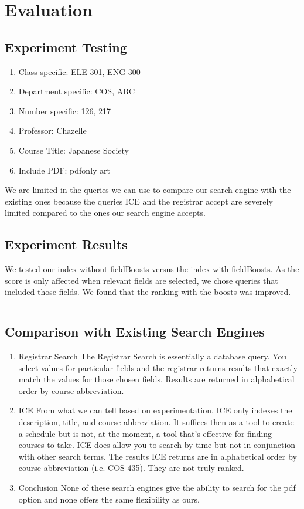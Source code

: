 \documentclass[12pt,letterpaper]{article}
\begin{document}
\section{Evaluation}
\subsection{Experiment Testing}
\begin{enumerate}
\item Class specific: ELE 301, ENG 300
\item Department specific: COS, ARC
\item Number specific: 126, 217
\item Professor: Chazelle
\item Course Title: Japanese Society
\item Include PDF: pdfonly art
\end{enumerate}

We are limited in the queries we can use to compare our search engine with the existing ones because the queries ICE and the registrar accept are severely limited compared to the ones our search engine accepts.
\subsection{Experiment Results}

We tested our index without fieldBoosts versus the index with fieldBoosts. As the score is only affected when relevant fields are selected, we chose queries that included those fields. We found that the ranking with the boosts was improved. 

\begin{tabular}{ | l | c | r |}
	
\end{tabular}

\subsection{Comparison with Existing Search Engines}
\begin{enumerate}
\item Registrar Search
  The Registrar Search is essentially a database query. You select values for particular fields and the registrar returns results that exactly match the values for those chosen fields. Results are returned in alphabetical order by course abbreviation. 
  
\item ICE
  From what we can tell based on experimentation, ICE only indexes the description, title, and course abbreviation. It suffices then as a tool to create a schedule but is not, at the moment, a tool that's effective for finding courses to take. ICE does allow you to search by time but not in conjunction with other search terms. The results ICE returns are in alphabetical order by course abbreviation (i.e. COS 435). They are not truly ranked.  
  
\item Conclusion
  None of these search engines give the ability to search for the pdf option and none offers the same flexibility as ours.
\end{enumerate}
\end{document}
